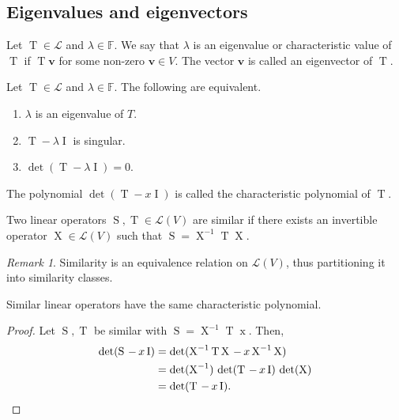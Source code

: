 \documentclass[11pt]{article}
\newcommand{\F}{\mathbb{F}}
\renewcommand{\vec}[1]{\boldsymbol{#1}}
\newcommand{\vv}{\vec{v}}
\newcommand{\op}[1]{\operatorname{#1}}
\newcommand{\opI}{\op{I}}
\newcommand{\opT}{\op{T}}
\newcommand{\opS}{\op{S}}
\newcommand{\alg}[1]{\mathscr{#1}}
\newcommand{\algL}{\alg{L}}
\theoremstyle{definition}
\theoremstyle{remark}
\newtheorem*{remark}{Remark}
\numberwithin{equation}{section}
\begin{document}
    \subsection{Eigenvalues and eigenvectors}
    \begin{definition}
        Let $\opT \in \algL$ and $\lambda \in \F$. We say that $\lambda$ is an
        eigenvalue or characteristic value of $\opT$ if $\opT\vv$ for some non-zero $\vv
        \in V$. The vector $\vv$ is called an eigenvector of $\opT$.
    \end{definition}

    \begin{theorem}
        Let $\opT \in \algL$ and $\lambda \in \F$. The following are equivalent.
        \begin{enumerate}
            \itemsep0em 
            \item $\lambda$ is an eigenvalue of $T$.
            \item $\opT - \lambda \opI$ is singular.
            \item $\det(\opT - \lambda \opI) = 0$.
        \end{enumerate}
    \end{theorem}

    \begin{definition}
        The polynomial $\det(\opT - x\opI)$ is called the characteristic polynomial
        of $\opT$.
    \end{definition}
    
    \begin{definition}
        Two linear operators $\opS, \opT \in \algL(V)$ are similar if there exists an
        invertible operator $\op{X} \in \algL(V)$ such that $\opS = \op{X}^{-1} \opT
        \op{X}$.

        \begin{remark}
            Similarity is an equivalence relation on $\algL(V)$, thus partitioning it
            into similarity classes.
        \end{remark}
    \end{definition}

    \begin{lemma}
        Similar linear operators have the same characteristic polynomial.
    \end{lemma}
    \begin{proof}
        Let $\opS, \opT$ be similar with $\opS = \op{X}^{-1}\opT\op{x}$. Then,
        \begin{align*}
            \det(\opS \,-\, x\opI) &= \det(\op{X}^{-1}\opT\op{X} \,-\, x\op{X}^{-1}\op{X}) \\
                &= \det(\op{X}^{-1})\,\det(\opT \,-\, x\opI)\,\det(\op{X}) \\
                &= \det(\opT \,-\, x\opI). \qedhere
        \end{align*}
    \end{proof}
    
\end{document}
